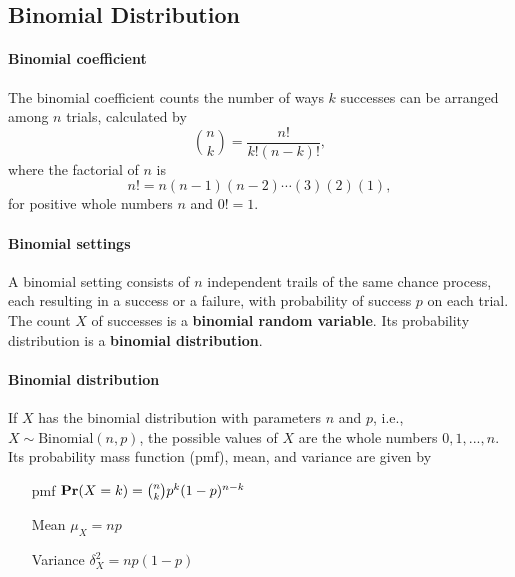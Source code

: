 \subsection{Binomial Distribution}

\paragraph{Binomial coefficient} The binomial coefficient counts the number of ways $k$ successes can be arranged among $n$ trials, calculated by
$$
    {n \choose k} = \dfrac{n!}{k!(n-k)!},
$$
where the factorial of $n$ is
$$
    n! = n(n-1)(n-2) \cdots (3)(2)(1),
$$
for positive whole numbers $n$ and $0! = 1$.

\paragraph{Binomial settings} A binomial setting consists of $n$ independent trails of the same chance process, each resulting in a success or a failure, with probability of success $p$ on each trial. The count $X$ of successes is a \textbf{binomial random variable}. Its probability distribution is a \textbf{binomial distribution}.

\paragraph{Binomial distribution} If $X$ has the binomial distribution with parameters $n$ and $p$, i.e., $X \sim \mathrm{Binomial}(n, p)$, the possible values of $X$ are the whole numbers $0, 1, ..., n$. Its probability mass function (pmf), mean, and variance are given by
\begin{itemize}[font=\sffamily\bfseries, leftmargin=1.95cm, style=nextline, itemsep=0cm]
\item[pmf] $\mathop{\mathbf{Pr}}(X=k) = {n \choose k} p^k (1-p)^{n-k}$
\item[Mean] $\mu_X = np$
\item[Variance] $\delta_X^2 = np(1-p)$
\end{itemize}

